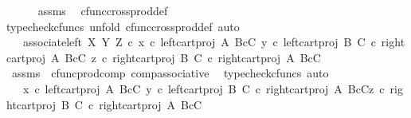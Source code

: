 \begin{isabellebody}
\ \ \ \ \isamarkupfalse%
\ assms\ \isamarkupfalse%
\ cfunc{\isacharunderscore}{\kern0pt}cross{\isacharunderscore}{\kern0pt}prod{\isacharunderscore}{\kern0pt}def{}\ \isamarkupfalse%
{\isacharparenleft}{\kern0pt}typecheck{\isacharunderscore}{\kern0pt}cfuncs{\isacharcomma}{\kern0pt}\ unfold\ cfunc{\isacharunderscore}{\kern0pt}cross{\isacharunderscore}{\kern0pt}prod{\isacharunderscore}{\kern0pt}def{}{\isacharcomma}{\kern0pt}\ auto{\isacharparenright}{\kern0pt}\ \isanewline
\ \ \isamarkupfalse%
\ \isamarkupfalse%
\ {\isachardoublequoteopen}{\isachardot}{\kern0pt}{\isachardot}{\kern0pt}{\isachardot}{\kern0pt}\ {\isacharequal}{\kern0pt}\ associate{\isacharunderscore}{\kern0pt}left\ X\ Y\ Z\ {\isasymcirc}\isactrlsub c\ {\isasymlangle}x\ {\isasymcirc}\isactrlsub c\ left{\isacharunderscore}{\kern0pt}cart{\isacharunderscore}{\kern0pt}proj\ A\ {\isacharparenleft}{\kern0pt}B{\isasymtimes}\isactrlsub cC{\isacharparenright}{\kern0pt}{\isacharcomma}{\kern0pt}\ {\isasymlangle}y\ {\isasymcirc}\isactrlsub c\ left{\isacharunderscore}{\kern0pt}cart{\isacharunderscore}{\kern0pt}proj\ B\ C\ {\isasymcirc}\isactrlsub c\ right{\isacharunderscore}{\kern0pt}cart{\isacharunderscore}{\kern0pt}proj\ A\ {\isacharparenleft}{\kern0pt}B{\isasymtimes}\isactrlsub cC{\isacharparenright}{\kern0pt}{\isacharcomma}{\kern0pt}\ z\ {\isasymcirc}\isactrlsub c\ right{\isacharunderscore}{\kern0pt}cart{\isacharunderscore}{\kern0pt}proj\ B\ C\ {\isasymcirc}\isactrlsub c\ right{\isacharunderscore}{\kern0pt}cart{\isacharunderscore}{\kern0pt}proj\ A\ {\isacharparenleft}{\kern0pt}B{\isasymtimes}\isactrlsub cC{\isacharparenright}{\kern0pt}{\isasymrangle}{\isasymrangle}{\isachardoublequoteclose}\isanewline
\ \ \ \ \isamarkupfalse%
\ assms\ \ cfunc{\isacharunderscore}{\kern0pt}prod{\isacharunderscore}{\kern0pt}comp\ comp{\isacharunderscore}{\kern0pt}associative{}\ \isamarkupfalse%
\ {\isacharparenleft}{\kern0pt}typecheck{\isacharunderscore}{\kern0pt}cfuncs{\isacharcomma}{\kern0pt}\ auto{\isacharparenright}{\kern0pt}\isanewline
\ \ \isamarkupfalse%
\ \isamarkupfalse%
\ {\isachardoublequoteopen}{\isachardot}{\kern0pt}{\isachardot}{\kern0pt}{\isachardot}{\kern0pt}\ {\isacharequal}{\kern0pt}\ {\isasymlangle}{\isasymlangle}x\ {\isasymcirc}\isactrlsub c\ left{\isacharunderscore}{\kern0pt}cart{\isacharunderscore}{\kern0pt}proj\ A\ {\isacharparenleft}{\kern0pt}B{\isasymtimes}\isactrlsub cC{\isacharparenright}{\kern0pt}{\isacharcomma}{\kern0pt}\ y\ {\isasymcirc}\isactrlsub c\ left{\isacharunderscore}{\kern0pt}cart{\isacharunderscore}{\kern0pt}proj\ B\ C\ {\isasymcirc}\isactrlsub c\ right{\isacharunderscore}{\kern0pt}cart{\isacharunderscore}{\kern0pt}proj\ A\ {\isacharparenleft}{\kern0pt}B{\isasymtimes}\isactrlsub cC{\isacharparenright}{\kern0pt}{\isasymrangle}{\isacharcomma}{\kern0pt}z\ {\isasymcirc}\isactrlsub c\ right{\isacharunderscore}{\kern0pt}cart{\isacharunderscore}{\kern0pt}proj\ B\ C\ {\isasymcirc}\isactrlsub c\ right{\isacharunderscore}{\kern0pt}cart{\isacharunderscore}{\kern0pt}proj\ A\ {\isacharparenleft}{\kern0pt}B{\isasymtimes}\isactrlsub cC{\isacharparenright}{\kern0pt}{\isasymrangle}{\isachardoublequoteclose}\isanewline

\end{isabellebody}
